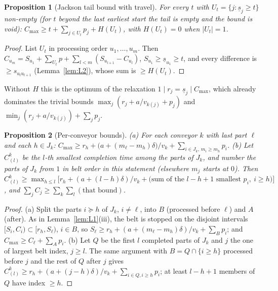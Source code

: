 \documentclass[11pt,a4paper]{article}
\theoremstyle{plain}
\newtheorem{proposition}{Proposition}
\theoremstyle{definition}
\theoremstyle{remark}
\begin{document}
\begin{proposition}[Jackson tail bound with travel]\label{prop:L3}
For every $t$ with $U_t=\{j:\underline s_j\ge t\}$ non-empty (for $t$ beyond the last
earliest start the tail is empty and the bound is void):
$C_{\max}\ge t+\sum_{j\in U_t}p_j+H(U_t)$, with $H(U_t)=0$ when $|U_t|=1$.
\end{proposition}
\begin{proof}
List $U_t$ in processing order $u_1,\dots,u_m$. Then
$C_{u_m}=S_{u_1}+\sum_{U_t}p+\sum_{l<m}(S_{u_{l+1}}-C_{u_l})$, $S_{u_1}\ge\underline s_{u_1}\ge t$,
and every difference is $\ge s_{u_lu_{l+1}}$ (Lemma~\ref{lem:L2}), whose sum is $\ge H(U_t)$.
\end{proof}
Without $H$ this is the optimum of the relaxation $1\mid r_j{=}\underline s_j\mid C_{\max}$,
which already dominates the trivial bounds $\max_j(r_j+a/v_{k(j)}+p_j)$ and
$\min_j(r_j+a/v_{k(j)})+\sum_jp_j$.

\begin{proposition}[Per-conveyor bounds]\label{prop:L4}
(a) For each conveyor $k$ with last part $\ell$ and each $h\in J_k$:
$C_{\max}\ge r_h+\bigl(a+(m_\ell-m_h)\delta\bigr)/v_k+\sum_{i\in J_k,\,m_i\ge m_h}p_i$.
(b) Let $C^k_{(l)}$ be the $l$-th smallest completion time among the parts of $J_k$, and
number the parts of $J_k$ from $1$ in belt order in this statement (elsewhere $m_j$ starts
at $0$). Then
$C^k_{(l)}\ge\max_{h\le l}\bigl[r_h+(a+(l-h)\delta)/v_k+\text{(sum of the }l-h+1\text{ smallest }p_i,\ i\ge h)\bigr]$,
and $\sum_jC_j\ge\sum_k\sum_l(\text{that bound})$.
\end{proposition}
\begin{proof}
(a) Split the parts $i\succeq h$ of $J_k$, $i\ne\ell$, into $B$ (processed before $\ell$)
and $A$ (after). As in Lemma~\ref{lem:L1}(iii), the belt is stopped on the disjoint
intervals $[S_i,C_i)\subset[r_h,S_\ell)$, $i\in B$, so
$S_\ell\ge r_h+(a+(m_\ell-m_h)\delta)/v_k+\sum_Bp_i$; and $C_{\max}\ge C_\ell+\sum_Ap_i$.
(b) Let $Q$ be the first $l$ completed parts of $J_k$ and $j$ the one of largest belt
index, $j\ge l$. The same argument with $B=Q\cap\{i\ge h\}$ processed before $j$ and the
rest of $Q$ after $j$ gives $C^k_{(l)}\ge r_h+(a+(j-h)\delta)/v_k+\sum_{i\in Q,i\ge h}p_i$;
at least $l-h+1$ members of $Q$ have index $\ge h$.
\end{proof}
\end{document}
